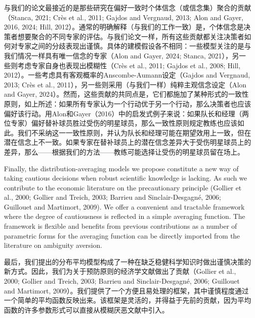 \documentclass[12pt,a4paper]{article}
\newenvironment{original}
  {\par\noindent\ignorespaces}
  {\par}
\newenvironment{translation}
  {\par\noindent{\color{transblue}\ignorespaces}}
  {\par\medskip}
\begin{document}
\begin{translation}
与我们的论文最接近的是那些研究在偏好一致时个体信念（或信念集）聚合的贡献（Stanca, 2021; Crès et al., 2011; Gajdos and Vergnaud, 2013; Alon and Gayer, 2016, 2024; Hill, 2012）。通常的明确解释（与我们的工作一致）是，个体信念是决策者想要聚合的不同专家的评估。与我们论文一样，所有这些贡献都关注决策者如何对专家之间的分歧表现出谨慎。具体的建模假设各不相同：一些模型关注的是与我们情况一样具有唯一信念的专家（Alon and Gayer, 2024; Stanca, 2021），另一些则考虑专家自身也表现出模糊性（Crès et al., 2011; Gajdos et al., 2008; Hill, 2012）。一些考虑具有客观概率的Anscombe-Aumann设定（Gajdos and Vergnaud, 2013; Crès et al., 2011），另一些则采用（与我们一样）纯粹主观信念设定（Alon and Gayer, 2024）。然而，这些贡献的共同点是，它们都施加了某种形式的一致性原则，如上所述：如果所有专家认为一个行动优于另一个行动，那么决策者也应该偏好该行动。用Alon和Gayer（2016）中的启发式例子来说：如果队长和经理（两位专家）偏好替补球员胜过受伤的明星球员，那么一致性原则规定教练也应该如此。我们不采纳这一一致性原则，并认为队长和经理可能在期望效用上一致，但在潜在信念上不一致。如果专家在替补球员上的潜在信念差异大于受伤明星球员上的差异，那么——根据我们的方法——教练可能选择让受伤的明星球员留在场上。
\end{translation}

\begin{original}
Finally, the distribution-averaging models we propose constitute a new way of taking cautious decisions when robust scientific knowledge is lacking. As such we contribute to the economic literature on the precautionary principle (Gollier et al., 2000; Gollier and Treich, 2003; Barrieu and Sinclair-Desgagn\'{e}, 2006; Guillouet and Martimort, 2009). We offer a convenient and tractable framework where the degree of cautiousness is reflected in a simple averaging function. The framework is flexible and benefits from previous contributions as a number of parametric forms for the averaging function can be directly imported from the literature on ambiguity aversion.
\end{original}

\begin{translation}
最后，我们提出的分布平均模型构成了一种在缺乏稳健科学知识时做出谨慎决策的新方式。因此，我们为关于预防原则的经济学文献做出了贡献（Gollier et al., 2000; Gollier and Treich, 2003; Barrieu and Sinclair-Desgagné, 2006; Guillouet and Martimort, 2009）。我们提供了一个方便且易处理的框架，其中谨慎程度通过一个简单的平均函数反映出来。该框架是灵活的，并得益于先前的贡献，因为平均函数的许多参数形式可以直接从模糊厌恶文献中引入。
\end{translation}
\end{document}
